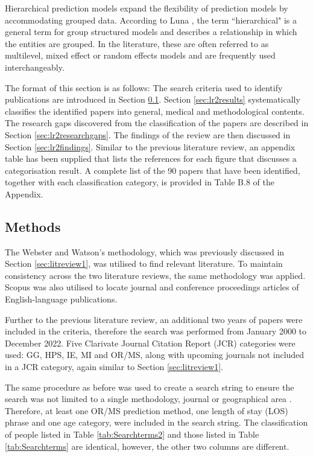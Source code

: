 \documentclass[../thesis.tex]{subfiles}
\begin{document}
Hierarchical prediction models expand the flexibility of prediction models by accommodating grouped data. According to Luna \cite{Luna1993}, the term ``hierarchical" is a general term for group structured models and describes a relationship in which the entities are grouped. In the literature, these are often referred to as multilevel, mixed effect or random effects models and are frequently used interchangeably.

The format of this section is as follows: The search criteria used to identify publications are introduced in Section \ref{sec:lt2Methods}. Section \ref{sec:lr2results} systematically classifies the identified papers into general, medical and methodological contents. The research gaps discovered from the classification of the papers are described in Section \ref{sec:lr2researchgaps}. The findings of the review are then discussed in Section \ref{sec:lr2findings}. Similar to the previous literature review, an appendix table has been supplied that lists the references for each figure that discusses a categorisation result. A complete list of the 90 papers that have been identified, together with each classification category, is provided in Table B.8 of the Appendix.


\subsection{Methods}\label{sec:lt2Methods}
The Webster and Watson's \cite{Webster} methodology, which was previously discussed in Section \ref{sec:litreview1}, was utilised to find relevant literature. To maintain consistency across the two literature reviews, the same methodology was applied. Scopus was also utilised to locate journal and conference proceedings articles of English-language publications.

Further to the previous literature review, an additional two years of papers were included in the criteria, therefore the search was performed from January 2000 to December 2022. Five Clarivate Journal Citation Report (JCR) categories were used: GG, HPS, IE, MI and OR/MS, along with upcoming journals not included in a JCR category, again similar to Section \ref{sec:litreview1}.

The same procedure as before was used to create a search string to ensure the search was not limited to a single methodology, journal or geographical area \cite{Webster}. Therefore, at least one OR/MS prediction method, one length of stay (LOS) phrase and one age category, were included in the search string. The classification of people listed in Table \ref{tab:Searchterms2} and those listed in Table \ref{tab:Searchterms} are identical, however, the other two columns are different. 
\end{document}
